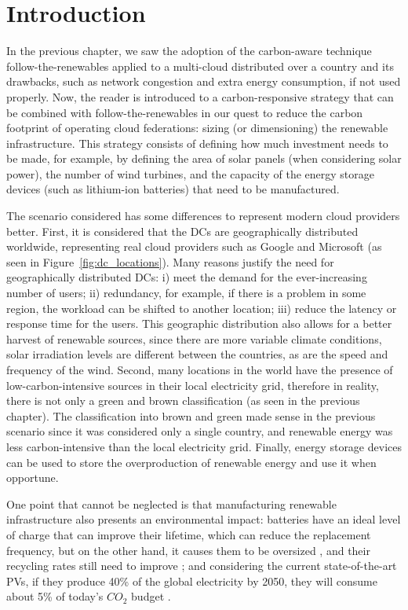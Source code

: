 \section{Introduction}

In the previous chapter, we saw the adoption of the carbon-aware technique follow-the-renewables applied to a multi-cloud distributed over a country and its drawbacks, such as network congestion and extra energy consumption, if not used properly. Now, the reader is introduced to a carbon-responsive strategy that can be combined with follow-the-renewables in our quest to reduce the carbon footprint of operating cloud federations: sizing (or dimensioning) the renewable infrastructure. This strategy consists of defining how much investment needs to be made, for example, by defining the area of solar panels (when considering solar power), the number of wind turbines, and the capacity of the energy storage devices (such as lithium-ion batteries) that need to be manufactured.


The scenario considered has some differences to represent modern cloud providers better. First, it is considered that the DCs are geographically distributed worldwide, representing real cloud providers such as Google and Microsoft (as seen in Figure~\ref{fig:dc_locations}). Many reasons justify the need for geographically distributed DCs: i) meet the demand for the ever-increasing number of users; ii) redundancy, for example, if there is a problem in some region, the workload can be shifted to another location; iii) reduce the latency or response time for the users. This geographic distribution also allows for a better harvest of renewable sources, since there are more variable climate conditions, solar irradiation levels are different between the countries, as are the speed and frequency of the  wind. Second, many locations in the world have the presence of low-carbon-intensive sources in their local electricity grid, therefore in reality, there is not only a green and brown classification (as seen in the previous chapter). The classification into brown and green made sense in the previous scenario since it was considered only a single country, and renewable energy was less carbon-intensive than the local electricity grid. Finally, energy storage devices can be used to store the overproduction of renewable energy and use it when opportune.


One point that cannot be neglected is that manufacturing renewable infrastructure also presents an environmental impact: batteries have an ideal level of charge that can improve their lifetime, which can reduce the replacement frequency, but on the other hand, it causes them to be oversized \cite{batteries_baumman}, and their recycling rates still need to improve \cite{bateries_RAHMAN}; and considering the current state-of-the-art PVs, if they produce 40\% of the global electricity by 2050, they will consume about 5\% of today’s ${CO_2}$ budget \cite{solar_co2}.

